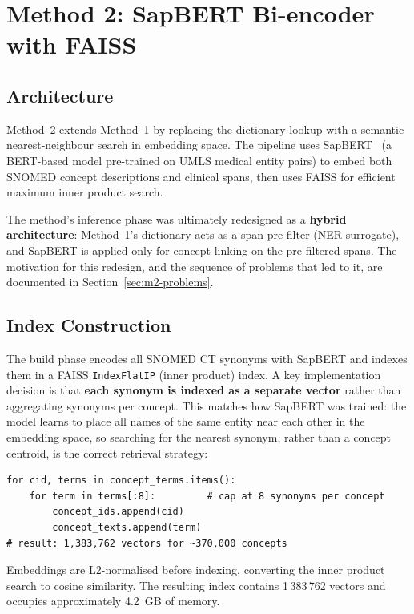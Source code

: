 \section{Method 2: SapBERT Bi-encoder with FAISS}

\subsection{Architecture}

Method~2 extends Method~1 by replacing the dictionary lookup with a semantic nearest-neighbour search in embedding space. The pipeline uses SapBERT~\cite{Kulyabin:2024} (a BERT-based model pre-trained on UMLS medical entity pairs) to embed both SNOMED concept descriptions and clinical spans, then uses FAISS for efficient maximum inner product search.

The method's inference phase was ultimately redesigned as a \textbf{hybrid architecture}: Method~1's dictionary acts as a span pre-filter (NER surrogate), and SapBERT is applied only for concept linking on the pre-filtered spans. The motivation for this redesign, and the sequence of problems that led to it, are documented in Section~\ref{sec:m2-problems}.

\subsection{Index Construction}

The build phase encodes all SNOMED CT synonyms with SapBERT and indexes them in a FAISS \texttt{IndexFlatIP} (inner product) index. A key implementation decision is that \textbf{each synonym is indexed as a separate vector} rather than aggregating synonyms per concept. This matches how SapBERT was trained: the model learns to place all names of the same entity near each other in the embedding space, so searching for the nearest synonym, rather than a concept centroid, is the correct retrieval strategy:

\begin{verbatim}
for cid, terms in concept_terms.items():
    for term in terms[:8]:         # cap at 8 synonyms per concept
        concept_ids.append(cid)
        concept_texts.append(term)
# result: 1,383,762 vectors for ~370,000 concepts
\end{verbatim}

Embeddings are L2-normalised before indexing, converting the inner product search to cosine similarity. The resulting index contains 1\,383\,762 vectors and occupies approximately 4.2~GB of memory.

